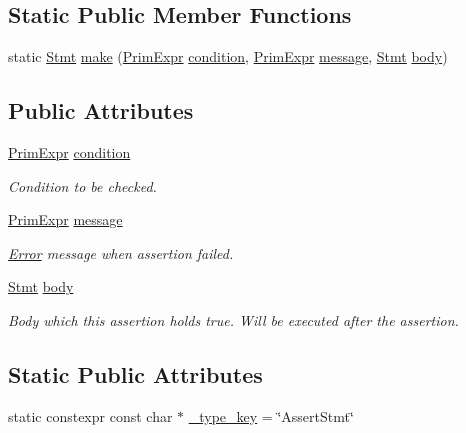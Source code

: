 \subsection*{Static Public Member Functions}
\begin{DoxyCompactItemize}
\item 
static \hyperlink{classtvm_1_1tir_1_1Stmt}{Stmt} \hyperlink{classtvm_1_1tir_1_1AssertStmtNode_abdd0a95299b297bab446c9710c039b06}{make} (\hyperlink{classtvm_1_1PrimExpr}{Prim\+Expr} \hyperlink{classtvm_1_1tir_1_1AssertStmtNode_a016ff228d0c944b8d295223f54858493}{condition}, \hyperlink{classtvm_1_1PrimExpr}{Prim\+Expr} \hyperlink{classtvm_1_1tir_1_1AssertStmtNode_a42ff732b4df33bddf74f9a92669cebb9}{message}, \hyperlink{classtvm_1_1tir_1_1Stmt}{Stmt} \hyperlink{classtvm_1_1tir_1_1AssertStmtNode_ad861e0e3a9f7d7aefe60cba36241d226}{body})
\end{DoxyCompactItemize}
\subsection*{Public Attributes}
\begin{DoxyCompactItemize}
\item 
\hyperlink{classtvm_1_1PrimExpr}{Prim\+Expr} \hyperlink{classtvm_1_1tir_1_1AssertStmtNode_a016ff228d0c944b8d295223f54858493}{condition}
\begin{DoxyCompactList}\small\item\em Condition to be checked. \end{DoxyCompactList}\item 
\hyperlink{classtvm_1_1PrimExpr}{Prim\+Expr} \hyperlink{classtvm_1_1tir_1_1AssertStmtNode_a42ff732b4df33bddf74f9a92669cebb9}{message}
\begin{DoxyCompactList}\small\item\em \hyperlink{classtvm_1_1Error}{Error} message when assertion failed. \end{DoxyCompactList}\item 
\hyperlink{classtvm_1_1tir_1_1Stmt}{Stmt} \hyperlink{classtvm_1_1tir_1_1AssertStmtNode_ad861e0e3a9f7d7aefe60cba36241d226}{body}
\begin{DoxyCompactList}\small\item\em Body which this assertion holds true. Will be executed after the assertion. \end{DoxyCompactList}\end{DoxyCompactItemize}
\subsection*{Static Public Attributes}
\begin{DoxyCompactItemize}
\item 
static constexpr const char $\ast$ \hyperlink{classtvm_1_1tir_1_1AssertStmtNode_a656ba70169caac2670439782234b2fa6}{\+\_\+type\+\_\+key} = \char`\"{}Assert\+Stmt\char`\"{}
\end{DoxyCompactItemize}


